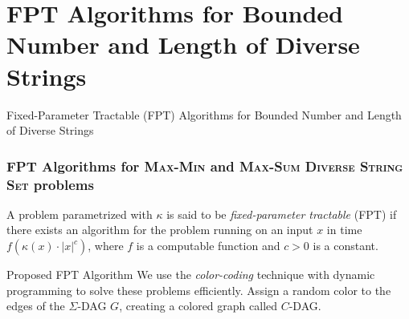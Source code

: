 \documentclass{beamer}
\begin{document}
\section{FPT Algorithms for Bounded Number and Length of Diverse Strings}
\begin{frame}
    \begin{center}
        \huge{Fixed-Parameter Tractable (FPT) Algorithms for Bounded Number and Length of Diverse Strings}
    \end{center}
\end{frame}

\begin{frame}
    \frametitle{FPT Algorithms for \textsc{Max-Min} and \textsc{Max-Sum Diverse String Set} problems}
    \begin{definition}
        A problem parametrized with $\kappa$ is said to be \emph{fixed-parameter tractable} (FPT) if there exists an algorithm for the problem running on an input $x$ in time $f(\kappa (x) \cdot |x|^c)$, where $f$ is a computable function and $c > 0$ is a constant.
    \end{definition}
    \begin{block}{Proposed FPT Algorithm}
        We use the \textit{color-coding} technique with dynamic programming to solve these problems efficiently. Assign a random color to the edges of the $\Sigma$-DAG $G$, creating a colored graph called $C$-DAG.
    \end{block}

\end{frame}
\end{document}
